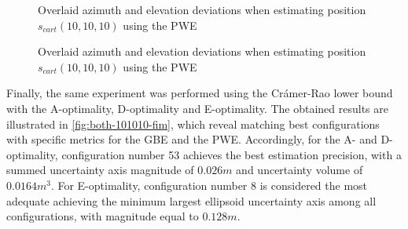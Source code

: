 \begin{figure}[!htbp]
	\captionsetup{justification=centering,margin=2cm}
	\caption{Overlaid azimuth and elevation deviations when estimating position $s_{cart}(10,10,10)$ using the PWE}
	\label{fig:errors-101010-pseudo}
\end{figure}

\begin{figure}[!htbp]
	\captionsetup{justification=centering,margin=2cm}
	\caption{Overlaid azimuth and elevation deviations when estimating position $s_{cart}(10,10,10)$ using the PWE}
	\label{fig:both-101010-pseudo}
\end{figure}

Finally, the same experiment was performed using the Crámer-Rao lower bound with the A-optimality, D-optimality and E-optimality. The obtained results are illustrated in \ref{fig:both-101010-fim}, which reveal matching best configurations with specific metrics for the GBE and the PWE. Accordingly, for the A- and D- optimality, configuration number 53 achieves the best estimation precision, with a summed uncertainty axis magnitude of $0.026m$ and uncertainty volume of $0.0164m^3$. For E-optimality, configuration number 8 is considered the most adequate achieving the minimum largest ellipsoid uncertainty axis among all configurations, with magnitude equal to $0.128m$.

